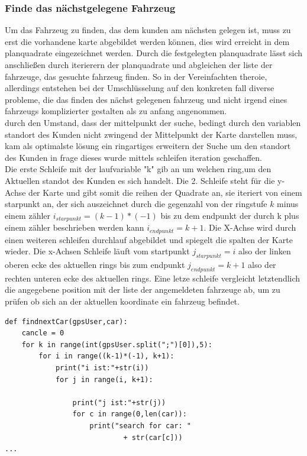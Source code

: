 \documentclass[conference]{IEEEtran}
\begin{document}
\subsubsection{Finde das nächstgelegene Fahrzeug}
Um das Fahrzeug  zu finden,  das dem kunden am nächsten  gelegen ist, muss zu erst die vorhandene karte abgebildet werden können, dies wird erreicht in dem planquadrate eingezeichnet werden. Durch die festgelegten planquadrate lässt sich anschließen durch iterierern der planquadrate und abgleichen der liste der fahrzeuge, das gesuchte fahrzeug finden. So in der Vereinfachten theroie, allerdings entstehen bei der Umschlüsselung auf den konkreten fall diverse probleme, die das finden des nächst gelegenen fahrzeug und nicht irgend eines fahrzeugs komplizierter gestalten als zu anfang angenommen.\\
durch den Umstand, dass der mittelpunkt der suche, bedingt durch den variablen standort des Kunden nicht zwingend der Mittelpunkt der Karte darstellen muss, kam als optimalste lösung ein ringartiges erweitern der Suche um den standort des Kunden in frage dieses wurde mittels schleifen iteration geschaffen.\\
Die erste Schleife mit der laufvariable "k" gib an um welchen ring,um den Aktuellen standot des Kunden es sich handelt. Die 2. Schleife steht für die y-Achse der Karte und gibt somit die reihen der Quadrate an, sie iteriert von einem starpunkt an, der sich auszeichnet durch die gegenzahl von der ringstufe $k$ minus einem zähler $i_{starpunkt} = (k-1)*(-1)$ bis zu dem endpunkt der durch k plus einem zähler beschrieben werden kann $i_{endpunkt} = k+1$. Die X-Achse wird durch einen weiteren schleifen durchlauf abgebildet und spiegelt die spalten der Karte wieder. Die x-Achsen Schleife läuft vom startpunkt $j_{starpunkt} = i $ also der linken oberen ecke des aktuellen rings bis zum endpunkt $j_{endpunkt} = k+1$ also der rechten unteren ecke des aktuellen rings. Eine letze schleife vergleicht letztendlich die angegebene position mit der liste der angemeldeten fahrzeuge ab, um zu prüfen ob sich an der aktuellen koordinate ein fahrzeug befindet. 
\begin{lstlisting}
def findnextCar(gpsUser,car):
    cancle = 0
    for k in range(int(gpsUser.split(";")[0]),5):
        for i in range((k-1)*(-1), k+1):
            print("i ist:"+str(i))
            for j in range(i, k+1):

                print("j ist:"+str(j))
                for c in range(0,len(car)):
                    print("search for car: "
                    		+ str(car[c]))
...
\end{lstlisting}
\end{document}
